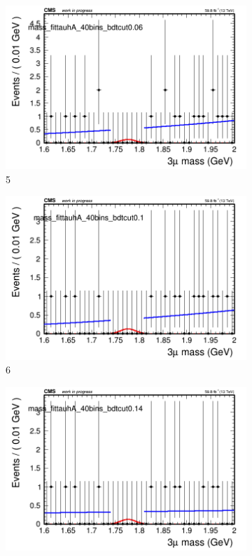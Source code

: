 \begin{figure}[h!]
\begin{subfigure}{0.2\textwidth}
        \includegraphics[width=\textwidth]{power_law/plots/tauhA/massfit_tauhA_40bins_bdtcut0.06.png}
        \caption{5}
    \end{subfigure}
    \begin{subfigure}{0.2\textwidth}
        \includegraphics[width=\textwidth]{power_law/plots/tauhA/massfit_tauhA_40bins_bdtcut0.1.png}
        \caption{6}
    \end{subfigure}
    \begin{subfigure}{0.2\textwidth}
        \includegraphics[width=\textwidth]{power_law/plots/tauhA/massfit_tauhA_40bins_bdtcut0.14.png}

\end{subfigure}
\end{figure}
